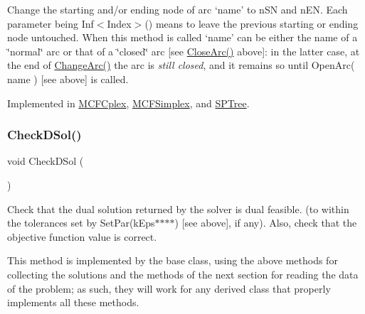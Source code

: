 Change the starting and/or ending node of arc `name' to n\+SN and n\+EN. Each parameter being Inf$<$\+Index$>$() means to leave the previous starting or ending node untouched. When this method is called `name' can be either the name of a \char`\"{}normal\char`\"{} arc or that of a \char`\"{}closed\char`\"{} arc \mbox{[}see \mbox{\hyperlink{class_m_c_f_class_ae1c33ba491b57343fbc157123fff5b11}{Close\+Arc()}} above\mbox{]}\+: in the latter case, at the end of \mbox{\hyperlink{class_m_c_f_class_aef2d28b0b0a2420d6b8b7093d827fa67}{Change\+Arc()}} the arc is {\itshape still closed}, and it remains so until Open\+Arc( name ) \mbox{[}see above\mbox{]} is called. 

Implemented in \mbox{\hyperlink{class_m_c_f_cplex_adbf1afd5cc24e1b5094f95945bd8e454}{M\+C\+F\+Cplex}}, \mbox{\hyperlink{class_m_c_f_simplex_a23980253602d1183531a93a82d6e7f96}{M\+C\+F\+Simplex}}, and \mbox{\hyperlink{class_s_p_tree_a23980253602d1183531a93a82d6e7f96}{S\+P\+Tree}}.

\mbox{\label{class_m_c_f_class_a81bd6bc3b87534b4a67d0d93abedbd93}} 
\subsubsection{\texorpdfstring{Check\+D\+Sol()}{CheckDSol()}}
{\footnotesize\ttfamily void Check\+D\+Sol (\begin{DoxyParamCaption}\item[{void}]{ }\end{DoxyParamCaption})\hspace{0.3cm}{\ttfamily [inline]}}

Check that the dual solution returned by the solver is dual feasible. (to within the tolerances set by Set\+Par(k\+Eps$\ast$$\ast$$\ast$$\ast$) \mbox{[}see above\mbox{]}, if any). Also, check that the objective function value is correct.

This method is implemented by the base class, using the above methods for collecting the solutions and the methods of the next section for reading the data of the problem; as such, they will work for any derived class that properly implements all these methods. \mbox{\label{class_m_c_f_class_a41b70e84f98f30b408d0ffb191ff4442}} 

